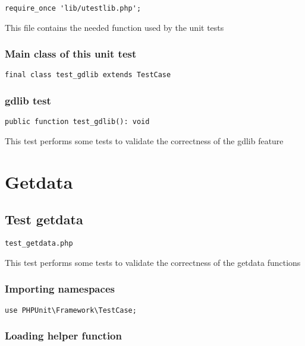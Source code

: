 \documentclass[a4paper]{article}
\begin{document}
\begin{lstlisting}
require_once 'lib/utestlib.php';
\end{lstlisting}

This file contains the needed function used by the unit tests

\hypertarget{toc212}{}
\subsubsection{Main class of this unit test}

\begin{lstlisting}
final class test_gdlib extends TestCase
\end{lstlisting}

\hypertarget{toc213}{}
\subsubsection{gdlib test}

\begin{lstlisting}
public function test_gdlib(): void
\end{lstlisting}

This test performs some tests to validate the correctness
of the gdlib feature


\hypertarget{toc214}{}
\section{Getdata}

\hypertarget{toc215}{}
\subsection{Test getdata}

\begin{lstlisting}
test_getdata.php
\end{lstlisting}

This test performs some tests to validate the correctness
of the getdata functions

\hypertarget{toc216}{}
\subsubsection{Importing namespaces}

\begin{lstlisting}
use PHPUnit\Framework\TestCase;
\end{lstlisting}

\hypertarget{toc217}{}
\subsubsection{Loading helper function}
\end{document}
